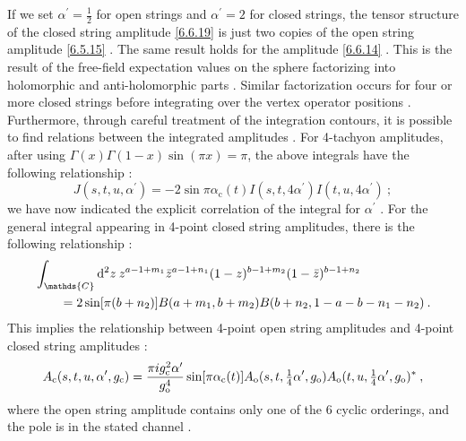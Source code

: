 If we set $\alpha^{\prime}=\frac{1}{2}$ for open strings and $\alpha^{\prime}=2$ for closed strings, the tensor structure of the closed string amplitude \eqref{6.6.19} is just two copies of the open string amplitude \eqref{6.5.15} . The same result holds for the amplitude \eqref{6.6.14} . This is the result of the free-field expectation values on the sphere factorizing into holomorphic and anti-holomorphic parts . Similar factorization occurs for four or more closed strings before integrating over the vertex operator positions . Furthermore, through careful treatment of the integration contours, it is possible to find relations between the integrated amplitudes . For 4-tachyon amplitudes, after using $\Gamma(x) \Gamma(1-x) \sin (\pi x)=\pi$, the above integrals have the following relationship :
\begin{equation}
	J(s, t, u, \alpha^{\prime})=-2 \sin \pi \alpha_{\mathrm{c}}(t) I(s, t, 4 \alpha^{\prime}) I(t, u, 4 \alpha^{\prime}) \:; \label{6.6.21}
\end{equation}
we have now indicated the explicit correlation of the integral for $\alpha^{\prime}$ . For the general integral appearing in 4-point closed string amplitudes, there is the following relationship :
\begin{align}
	&\int_{\mathds{C}} \dif^{2} z\: z^{a-1+m_{1}} \bar{z}^{a-1+n_{1}}(1-z)^{b-1+m_{2}}(1-\bar{z})^{b-1+n_{2}} \nonumber \\
	&\qquad =2 \sin [\pi(b+n_{2})] B(a+m_{1}, b+m_{2}) B(b+n_{2}, 1-a-b-n_{1}-n_{2}) \:. \label{6.6.22}
\end{align}
This implies the relationship between 4-point open string amplitudes and 4-point closed string amplitudes :
\begin{equation}
	A_{\mathrm{c}}(s, t, u, \alpha^{\prime}, g_{\mathrm{c}}) = 
	\frac{\pi i g_{\mathrm{c}}^{2} \alpha^{\prime}}{g_{\mathrm{o}}^{4}} 
	\sin [\pi \alpha_{\mathrm{c}}(t)] A_{\mathrm{o}}(s, t, \tfrac{1}{4} \alpha^{\prime}, g_{\mathrm{o}}) 
	A_{\mathrm{o}}(t, u, \tfrac{1}{4} \alpha^{\prime}, g_{\mathrm{o}})^{*} \:, \label{6.6.23}
\end{equation}
where the open string amplitude contains only one of the 6 cyclic orderings, and the pole is in the stated channel .

